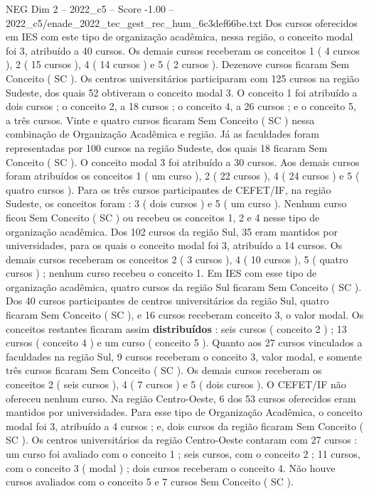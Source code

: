 \begin{textsample}{NEG Dim 2 – 2022\_c5 – Score -1.00 – 2022\_c5/enade\_2022\_tec\_gest\_rec\_hum\_6c3def66be.txt}
Dos cursos oferecidos em IES com este tipo de organização acadêmica, nessa região, o conceito modal foi 3, atribuído a 40 cursos.
Os demais cursos receberam os conceitos 1 ( 4 cursos ), 2 ( 15 cursos ), 4 ( 14 cursos ) e 5 ( 2 cursos ).
Dezenove cursos ficaram Sem Conceito ( SC ).
Os centros universitários participaram com 125 cursos na região Sudeste, dos quais 52 obtiveram o conceito modal 3.
O conceito 1 foi atribuído a dois cursos ; o conceito 2, a 18 cursos ; o conceito 4, a 26 cursos ; e o conceito 5, a três cursos.
Vinte e quatro cursos ficaram Sem Conceito ( SC ) nessa combinação de Organização Acadêmica e região.
Já as faculdades foram representadas por 100 cursos na região Sudeste, dos quais 18 ficaram Sem Conceito ( SC ).
O conceito modal 3 foi atribuído a 30 cursos.
Aos demais cursos foram atribuídos os conceitos 1 ( um curso ), 2 ( 22 cursos ), 4 ( 24 cursos ) e 5 ( quatro cursos ).
Para os três cursos participantes de CEFET/IF, na região Sudeste, os conceitos foram : 3 ( dois cursos ) e 5 ( um curso ).
Nenhum curso ficou Sem Conceito ( SC ) ou recebeu os conceitos 1, 2 e 4 nesse tipo de organização acadêmica.
Dos 102 cursos da região Sul, 35 eram mantidos por universidades, para os quais o conceito modal foi 3, atribuído a 14 cursos.
Os demais cursos receberam os conceitos 2 ( 3 cursos ), 4 ( 10 cursos ), 5 ( quatro cursos ) ; nenhum curso recebeu o conceito 1.
Em IES com esse tipo de organização acadêmica, quatro cursos da região Sul ficaram Sem Conceito ( SC ).
Dos 40 cursos participantes de centros universitários da região Sul, quatro ficaram Sem Conceito ( SC ), e 16 cursos receberam conceito 3, o valor modal.
Os conceitos restantes ficaram assim \textbf{distribuídos} : seis cursos ( conceito 2 ) ; 13 cursos ( conceito 4 ) e um curso ( conceito 5 ).
Quanto aos 27 cursos vinculados a faculdades na região Sul, 9 cursos receberam o conceito 3, valor modal, e somente três cursos ficaram Sem Conceito ( SC ).
Os demais cursos receberam os conceitos 2 ( seis cursos ), 4 ( 7 cursos ) e 5 ( dois cursos ).
O CEFET/IF não ofereceu nenhum curso.
Na região Centro-Oeste, 6 dos 53 cursos oferecidos eram mantidos por universidades.
Para esse tipo de Organização Acadêmica, o conceito modal foi 3, atribuído a 4 cursos ; e, dois cursos da região ficaram Sem Conceito ( SC ).
Os centros universitários da região Centro-Oeste contaram com 27 cursos : um curso foi avaliado com o conceito 1 ; seis cursos, com o conceito 2 ; 11 cursos, com o conceito 3 ( modal ) ; dois cursos receberam o conceito 4.
Não houve cursos avaliados com o conceito 5 e 7 cursos Sem Conceito ( SC ).

\end{textsample}
